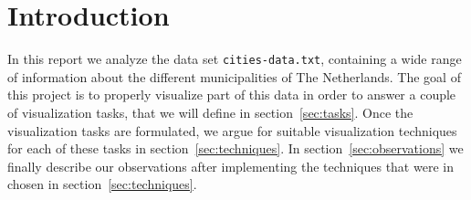 \section{Introduction}\label{sec:intro}
In this report we analyze the data set \texttt{cities-data.txt}, containing a wide range of information about the different municipalities of The Netherlands. The goal of this project is to properly visualize part of this data in order to answer a couple of visualization tasks, that we will define in section~\ref{sec:tasks}. Once the visualization tasks are formulated, we argue for suitable visualization techniques for each of these tasks in section~\ref{sec:techniques}. In section~\ref{sec:observations} we finally describe our observations after implementing the techniques that were in chosen in section~\ref{sec:techniques}.